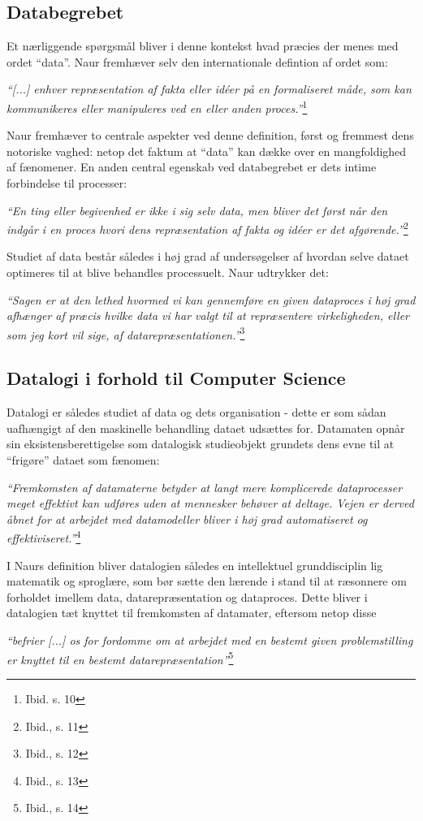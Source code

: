 \documentclass[10pt,a4paper]{article}
\newcommand{\citat}[2]{\begin{justify}\textit{``#1''}\hspace{0.1cm}\footnote{#2}\end{justify}}
\begin{document}
\subsection{Databegrebet}
Et nærliggende spørgsmål bliver i denne kontekst hvad præcies der menes med
ordet ``data''. Naur fremhæver selv den internationale defintion af ordet som:
\citat{[...] enhver repræsentation af fakta eller idéer på en formaliseret måde, som
kan kommunikeres eller manipuleres ved en eller anden proces.}{Ibid. s. 10}
Naur fremhæver to centrale aspekter ved denne definition, først og fremmest
dens notoriske vaghed: netop det faktum at ``data'' kan dække over en
mangfoldighed af fænomener. En anden central egenskab ved databegrebet er dets 
intime forbindelse til processer: \citat{En ting eller begivenhed er ikke i sig 
selv data, men bliver det først når den indgår i en proces hvori dens repræsentation 
af fakta og idéer er det afgørende.}{Ibid., s. 11} Studiet af data består således i
høj grad af undersøgelser af hvordan selve dataet optimeres til at blive behandles
processuelt. Naur udtrykker det: \citat{Sagen er at den lethed 
hvormed vi kan gennemføre en given dataproces i høj grad afhænger af præcis hvilke
data vi har valgt til at repræsentere virkeligheden, eller som jeg kort vil sige,
af \emph{datarepræsentationen}.}{Ibid., s. 12}

\subsection{Datalogi i forhold til Computer Science}
Datalogi er således studiet af data og dets organisation - dette er som sådan 
uafhængigt af den maskinelle behandling dataet udsættes for. Datamaten opnår sin 
eksistensberettigelse som datalogisk studieobjekt grundets dens evne til at 
``frigøre'' dataet som fænomen: \citat{Fremkomsten af datamaterne
betyder at langt mere komplicerede dataprocesser meget effektivt kan udføres
uden at mennesker behøver at deltage. Vejen er derved åbnet for at arbejdet
med datamodeller bliver i høj grad automatiseret og effektiviseret.}{Ibid., s. 13}
I Naurs definition bliver datalogien således en intellektuel grunddisciplin 
lig matematik og sproglære, som bør sætte den lærende i stand til at 
ræsonnere om forholdet imellem data, datarepræsentation og dataproces. 
Dette bliver i datalogien tæt knyttet til fremkomsten af datamater, eftersom 
netop disse \citat{befrier [...] os for fordomme om at arbejdet med en bestemt given
problemstilling er knyttet til en bestemt datarepræsentation}{Ibid., s. 14} 
\end{document}
